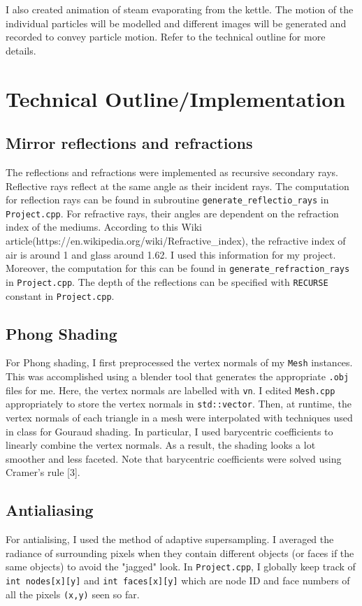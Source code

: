 \documentclass{article}
\begin{document}
I also created animation of steam evaporating from the kettle. The motion of the individual particles will be modelled and different images will be generated and recorded to convey particle motion. Refer to the technical outline for more details.

\section{Technical Outline/Implementation}

\subsection{Mirror reflections and refractions}
The reflections and refractions were implemented as recursive secondary rays. Reflective rays reflect at the same angle as their incident rays. The computation for reflection rays can be found in subroutine \texttt{generate\_reflectio\_rays} in \texttt{Project.cpp}. For refractive rays, their angles are dependent on the refraction index of the mediums. According to this Wiki article(https://en.wikipedia.org/wiki/Refractive\_index), the refractive index of air is around 1 and glass around 1.62. I used this information for my project. Moreover, the computation for this can be found in \texttt{generate\_refraction\_rays} in \texttt{Project.cpp}. The depth of the reflections can be specified with \texttt{RECURSE} constant in \texttt{Project.cpp}.

\subsection{Phong Shading}
For Phong shading, I first preprocessed the vertex normals of my \texttt{Mesh} instances. This was accomplished using a blender tool that generates the appropriate \texttt{.obj} files for me. Here, the vertex normals are labelled with \texttt{vn}. I edited \texttt{Mesh.cpp} appropriately to store the vertex normals in \texttt{std::vector}. Then, at runtime, the vertex normals of each triangle in a mesh were interpolated with techniques used in class for Gouraud shading. In particular, I used barycentric coefficients to linearly combine the vertex normals. As a result, the shading looks a lot smoother and less faceted. Note that barycentric coefficients were solved using Cramer's rule [3].

\subsection{Antialiasing}
For antialising, I used the method of adaptive supersampling. I averaged the radiance of surrounding pixels when they  contain different objects (or faces if the same objects) to avoid the "jagged" look. In \texttt{Project.cpp}, I globally keep track of \texttt{int nodes[x][y]} and \texttt{int faces[x][y]} which are node ID and face numbers of all the pixels \texttt{(x,y)} seen so far.
\end{document}
